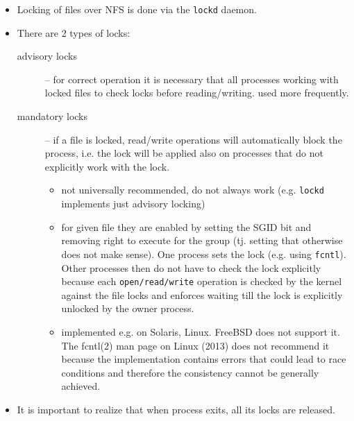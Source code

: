 \begin{itemize}
\item Locking of files over NFS is done via the \texttt{lockd} daemon.
\item There are 2 types of locks:
    \begin{description}
    \item [advisory locks] -- for correct operation it is necessary that all
    processes working with locked files to check locks before reading/writing.
    used more frequently.
    \item [mandatory locks] -- if a file is locked, read/write operations will
    automatically block the process, i.e. the lock will be applied also on
    processes that do not explicitly work with the lock.
        \begin{itemize}
	\label{MANDATORY}
	\item not universally recommended, do not always work
        (e.g. \texttt{lockd} implements just advisory locking)
	\item for given file they are enabled by setting the SGID bit and
        removing right to execute for the group
	(tj. setting that otherwise does not make sense).
	One process sets the lock (e.g. using \texttt{fcntl}). Other processes
	then do not have to check the lock explicitly because each
	\texttt{open/read/write} operation is checked by the kernel against
	the file locks and enforces waiting till the lock is explicitly
	unlocked by the owner process.\\
	\item implemented e.g. on Solaris, Linux. FreeBSD does not support it.
	The fcntl(2) man page on Linux (2013) does not recommend it because
	the implementation contains errors that could lead to race conditions
	and therefore the consistency cannot be generally achieved.
        \end{itemize}
    \end{description}
\item It is important to realize that when process exits, all its locks are
released.
\end{itemize}



